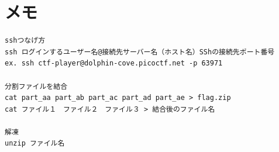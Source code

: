 \documentclass[a4paper,11pt,lualatex,ja=standard]{bxjsarticle}
\begin{document}
\section{メモ}
\begin{verbatim}
sshつなげ方
ssh ログインするユーザー名@接続先サーバー名（ホスト名）SShの接続先ポート番号 
ex. ssh ctf-player@dolphin-cove.picoctf.net -p 63971

分割ファイルを結合
cat part_aa part_ab part_ac part_ad part_ae > flag.zip
cat ファイル１　ファイル２　ファイル３ > 結合後のファイル名

解凍
unzip ファイル名

\end{verbatim}
\end{document}
